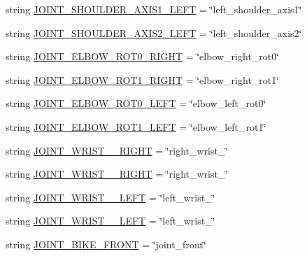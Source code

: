 \begin{DoxyCompactItemize}
\item 
string \mbox{\hyperlink{namespacesteering__simulation_a613bf71b0e0c3452f92b4853e2e62220}{J\+O\+I\+N\+T\+\_\+\+S\+H\+O\+U\+L\+D\+E\+R\+\_\+\+A\+X\+I\+S1\+\_\+\+L\+E\+FT}} = \char`\"{}left\+\_\+shoulder\+\_\+axis1\char`\"{}
\item 
string \mbox{\hyperlink{namespacesteering__simulation_ad9da62cd2eb0c4000d1fc4eda6017364}{J\+O\+I\+N\+T\+\_\+\+S\+H\+O\+U\+L\+D\+E\+R\+\_\+\+A\+X\+I\+S2\+\_\+\+L\+E\+FT}} = \char`\"{}left\+\_\+shoulder\+\_\+axis2\char`\"{}
\item 
string \mbox{\hyperlink{namespacesteering__simulation_a87ec11ba1fc1588a0cd2cc310e9dd12d}{J\+O\+I\+N\+T\+\_\+\+E\+L\+B\+O\+W\+\_\+\+R\+O\+T0\+\_\+\+R\+I\+G\+HT}} = \char`\"{}elbow\+\_\+right\+\_\+rot0\char`\"{}
\item 
string \mbox{\hyperlink{namespacesteering__simulation_a1a8aae1f17bde6bb8d80c73e7f546434}{J\+O\+I\+N\+T\+\_\+\+E\+L\+B\+O\+W\+\_\+\+R\+O\+T1\+\_\+\+R\+I\+G\+HT}} = \char`\"{}elbow\+\_\+right\+\_\+rot1\char`\"{}
\item 
string \mbox{\hyperlink{namespacesteering__simulation_a6bc051ea14ae98684ec54faf12a80d18}{J\+O\+I\+N\+T\+\_\+\+E\+L\+B\+O\+W\+\_\+\+R\+O\+T0\+\_\+\+L\+E\+FT}} = \char`\"{}elbow\+\_\+left\+\_\+rot0\char`\"{}
\item 
string \mbox{\hyperlink{namespacesteering__simulation_a95ae3d26f956b491229c78d10dee1aba}{J\+O\+I\+N\+T\+\_\+\+E\+L\+B\+O\+W\+\_\+\+R\+O\+T1\+\_\+\+L\+E\+FT}} = \char`\"{}elbow\+\_\+left\+\_\+rot1\char`\"{}
\item 
string \mbox{\hyperlink{namespacesteering__simulation_a97c26a57b04116975fbd66982ffe0477}{J\+O\+I\+N\+T\+\_\+\+W\+R\+I\+S\+T\+\_\+\_\+\+R\+I\+G\+HT}} = \char`\"{}right\+\_\+wrist\+\_\char`\"{}
\item 
string \mbox{\hyperlink{namespacesteering__simulation_a1ff71de09a5b70901b4321e8cf68d061}{J\+O\+I\+N\+T\+\_\+\+W\+R\+I\+S\+T\+\_\+\_\+\+R\+I\+G\+HT}} = \char`\"{}right\+\_\+wrist\+\_\char`\"{}
\item 
string \mbox{\hyperlink{namespacesteering__simulation_a1292b9f1429c017d07ec3de6b2f0a7bf}{J\+O\+I\+N\+T\+\_\+\+W\+R\+I\+S\+T\+\_\+\_\+\+L\+E\+FT}} = \char`\"{}left\+\_\+wrist\+\_\char`\"{}
\item 
string \mbox{\hyperlink{namespacesteering__simulation_a0032de0d6332a1ae30dee3b30019d5f8}{J\+O\+I\+N\+T\+\_\+\+W\+R\+I\+S\+T\+\_\+\_\+\+L\+E\+FT}} = \char`\"{}left\+\_\+wrist\+\_\char`\"{}
\item 
string \mbox{\hyperlink{namespacesteering__simulation_a745b702c18a3c9c7ec661d2255a662c6}{J\+O\+I\+N\+T\+\_\+\+B\+I\+K\+E\+\_\+\+F\+R\+O\+NT}} = \char`\"{}joint\+\_\+front\char`\"{}

\end{DoxyCompactItemize}
